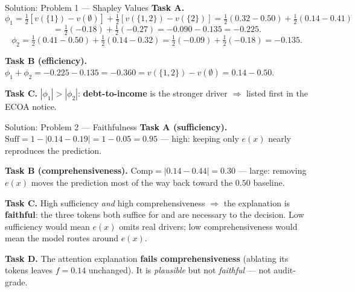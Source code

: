 \documentclass[9pt,t]{beamer}
\begin{document}
\begin{frame}{Solution: Problem 1 --- Shapley Values}
\textbf{Task A.}
\[
\phi_1 = \tfrac{1}{2}[v(\{1\})-v(\emptyset)] + \tfrac{1}{2}[v(\{1,2\})-v(\{2\})]
       = \tfrac{1}{2}(0.32-0.50) + \tfrac{1}{2}(0.14-0.41)
\]
\[
= \tfrac{1}{2}(-0.18) + \tfrac{1}{2}(-0.27) = -0.090 - 0.135 = \mathbf{-0.225}.
\]
\[
\phi_2 = \tfrac{1}{2}(0.41-0.50) + \tfrac{1}{2}(0.14-0.32)
       = \tfrac{1}{2}(-0.09) + \tfrac{1}{2}(-0.18) = \mathbf{-0.135}.
\]

\textbf{Task B (efficiency).}
$\phi_1 + \phi_2 = -0.225 - 0.135 = -0.360 = v(\{1,2\}) - v(\emptyset) = 0.14-0.50.$ \checkmark

\medskip
\textbf{Task C.} $|\phi_1| > |\phi_2|$: \textbf{debt-to-income} is the stronger
driver $\Rightarrow$ listed first in the ECOA notice.
\end{frame}

\begin{frame}{Solution: Problem 2 --- Faithfulness}
\textbf{Task A (sufficiency).}
$\text{Suff} = 1 - |0.14 - 0.19| = 1 - 0.05 = \mathbf{0.95}$ --- high: keeping
only $e(x)$ nearly reproduces the prediction.

\medskip
\textbf{Task B (comprehensiveness).}
$\text{Comp} = |0.14 - 0.44| = \mathbf{0.30}$ --- large: removing $e(x)$ moves the
prediction most of the way back toward the $0.50$ baseline.

\medskip
\textbf{Task C.} High sufficiency \emph{and} high comprehensiveness $\Rightarrow$
the explanation is \textbf{faithful}: the three tokens both suffice for and are
necessary to the decision. Low sufficiency would mean $e(x)$ omits real drivers;
low comprehensiveness would mean the model routes around $e(x)$.

\medskip
\textbf{Task D.} The attention explanation \textbf{fails comprehensiveness}
(ablating its tokens leaves $f=0.14$ unchanged). It is \emph{plausible} but not
\emph{faithful} --- not audit-grade.
\end{frame}
\end{document}
